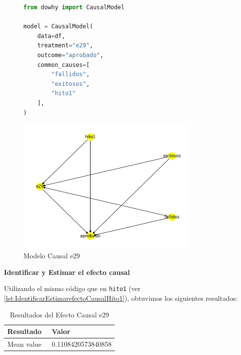 \begin{figure}[H]
    \centering
    \begin{minipage}{0.48\textwidth}
        \begin{lstlisting}[language=Python, caption=Modelo causal e29, label=lst:model_causalE29]
from dowhy import CausalModel

model = CausalModel(
    data=df,
    treatment="e29",
    outcome="aprobado",
    common_causes=[
        "fallidos",
        "exitosos",
        "hito1"
    ],
)
        \end{lstlisting}
    \end{minipage}
    \hfill
    \begin{minipage}{0.48\textwidth}
        \centering
        \includegraphics[width=0.8\textwidth]{img/causalidad/graph_causal_model_e29.png}
        \caption{Modelo Causal e29}
        \label{fig:modelo_causal_e29}
    \end{minipage}
\end{figure}

\textbf{Identificar y Estimar el efecto causal}

Utilizando el mismo código que en \texttt{hito1} (ver \ref{lst:IdentificarEstimarefectoCausalHito1}), obtuvimos los siguientes resultados:

\begin{table}[H]
    \centering        
    \begin{tabular}{lp{0.6\linewidth}}
        \toprule
        \textbf{Resultado} & \textbf{Valor} \\
        \midrule
        Mean value & 0.1108420573840858 \\
        \bottomrule
    \end{tabular}
    \caption{Resultados del Efecto Causal e29}
    \label{tab:efecto_causal_e29}
\end{table}

